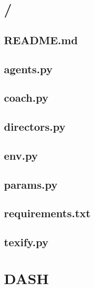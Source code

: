 \documentclass{article}
\begin{document}
\tableofcontents
\newpage
\section{/}
\subsection[README.md]{README.md}

\newpage

\subsection[agents.py]{agents.py}

\newpage

\subsection[coach.py]{coach.py}

\newpage

\subsection[directors.py]{directors.py}

\newpage

\subsection[env.py]{env.py}

\newpage

\subsection[params.py]{params.py}

\newpage

\subsection[requirements.txt]{requirements.txt}

\newpage

\subsection[texify.py]{texify.py}

\newpage

\section{DASH}
\end{document}
